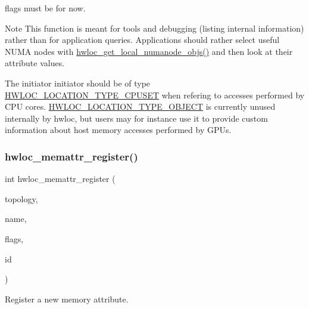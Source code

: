 {\ttfamily flags} must be {} for now.

\begin{DoxyNote}{Note}
This function is meant for tools and debugging (listing internal information) rather than for application queries. Applications should rather select useful N\+U\+MA nodes with \hyperlink{a00211_ga569e80c5be7ef27649b0ef5aa52ffcdc}{hwloc\+\_\+get\+\_\+local\+\_\+numanode\+\_\+objs()} and then look at their attribute values.

The initiator {\ttfamily initiator} should be of type \hyperlink{a00211_gga33099ba58f607fc70925da3777688586a7135318a86361ad75fd1648e6bf6d174}{H\+W\+L\+O\+C\+\_\+\+L\+O\+C\+A\+T\+I\+O\+N\+\_\+\+T\+Y\+P\+E\+\_\+\+C\+P\+U\+S\+ET} when refering to accesses performed by C\+PU cores. \hyperlink{a00211_gga33099ba58f607fc70925da3777688586af637c39b23d48cff15ddb008644aaa84}{H\+W\+L\+O\+C\+\_\+\+L\+O\+C\+A\+T\+I\+O\+N\+\_\+\+T\+Y\+P\+E\+\_\+\+O\+B\+J\+E\+CT} is currently unused internally by hwloc, but users may for instance use it to provide custom information about host memory accesses performed by G\+P\+Us. 
\end{DoxyNote}
\mbox{\label{a00212_ga770657d1e44b09e93e09f623936c1e5f}} 
\subsubsection{\texorpdfstring{hwloc\+\_\+memattr\+\_\+register()}{hwloc\_memattr\_register()}}
{\footnotesize\ttfamily int hwloc\+\_\+memattr\+\_\+register (\begin{DoxyParamCaption}\item[{\hyperlink{a00186_ga9d1e76ee15a7dee158b786c30b6a6e38}{hwloc\+\_\+topology\+\_\+t}}]{topology,  }\item[{const char $\ast$}]{name,  }\item[{unsigned long}]{flags,  }\item[{\hyperlink{a00211_gacc82003a8610be554615995f0996c888}{hwloc\+\_\+memattr\+\_\+id\+\_\+t} $\ast$}]{id }\end{DoxyParamCaption})}



Register a new memory attribute. 

